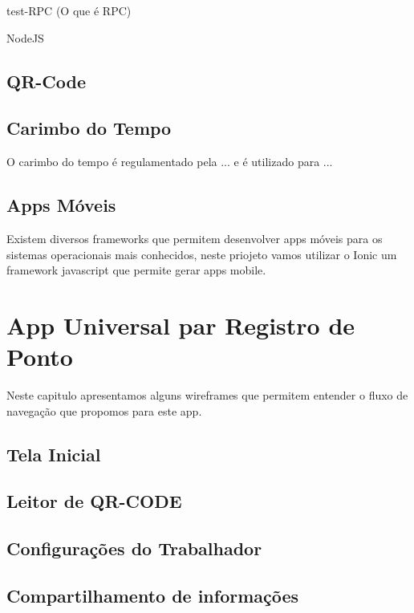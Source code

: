 \documentclass[12pt,openright,twoside,a4paper,english, brazil]{abntex2} %
\begin{document}
\begin{itemize}
test-RPC (O que é RPC)

NodeJS

\section{QR-Code}

\section{Carimbo do Tempo}

O carimbo do tempo é regulamentado pela ... e é utilizado para ...

\section{Apps Móveis}

Existem diversos frameworks que permitem desenvolver apps móveis para os sistemas operacionais mais conhecidos, neste priojeto vamos utilizar o Ionic um framework javascript que permite gerar apps mobile.

\chapter{App Universal par Registro de Ponto}


Neste capitulo apresentamos alguns wireframes que permitem entender o fluxo de navegação que propomos para este app.

\section{Tela Inicial}

\section{Leitor de QR-CODE}

\section{Configurações do Trabalhador}

\section{Compartilhamento de informações}


\end{itemize}
\end{document}
